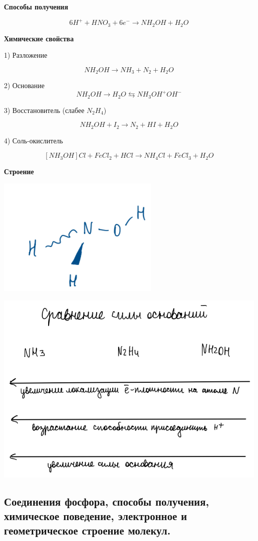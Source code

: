 \documentclass[14pt,a4paper]{scrartcl}
\begin{document}
\textbf{Способы получения}

$$6H^+ + HNO_3 + 6e^- \rightarrow NH_2OH + H_2O$$

\textbf{Химические свойства}

1) Разложение 

$$NH_2OH \rightarrow NH_3 + N_2 +H_2O$$

2) Основание 
$$NH_2OH \rightarrow H_2O \leftrightarrows NH_3OH^+ OH^-$$

3) Восстановитель (слабее $N_2H_4$)

$$NH_2OH + I_2 \rightarrow N_2 + HI + H_2O$$

4) Соль-окислитель

$$[NH_3OH]Cl + FeCl_2 + HCl \rightarrow NH_4Cl + FeCl_3 + H_2O$$

\textbf{Строение}

\includegraphics{8v13.png}

\includegraphics{8v14.png}

\subsection{Соединения фосфора, способы получения, химическое поведение, электронное и геометрическое строение молекул.}
\end{document}
